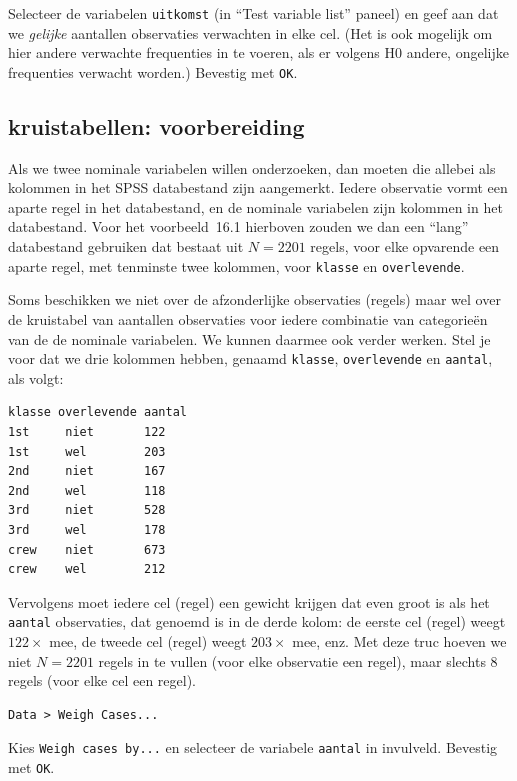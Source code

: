 \documentclass[
]{book}
\begin{document}
Selecteer de variabelen \texttt{uitkomst} (in ``Test variable list'' paneel) en
geef aan dat we \emph{gelijke} aantallen observaties verwachten in elke cel.
(Het is ook mogelijk om hier andere verwachte frequenties in te voeren,
als er volgens H0 andere, ongelijke frequenties verwacht worden.)
Bevestig met \texttt{OK}.

\hypertarget{kruistabellen-voorbereiding}{%
\subsection{kruistabellen: voorbereiding}\label{kruistabellen-voorbereiding}}

Als we twee nominale variabelen willen onderzoeken, dan moeten die
allebei als kolommen in het SPSS databestand zijn aangemerkt. Iedere
observatie vormt een aparte regel in het databestand, en de nominale
variabelen zijn kolommen in het databestand. Voor het
voorbeeld~16.1 hierboven zouden we dan een ``lang'' databestand
gebruiken dat bestaat uit \(N=2201\) regels, voor elke opvarende een
aparte regel, met tenminste twee kolommen, voor \texttt{klasse} en
\texttt{overlevende}.

Soms beschikken we niet over de afzonderlijke observaties (regels) maar
wel over de kruistabel van aantallen observaties voor iedere combinatie
van categorieën van de de nominale variabelen. We kunnen daarmee ook
verder werken. Stel je voor dat we drie kolommen hebben, genaamd
\texttt{klasse}, \texttt{overlevende} en \texttt{aantal}, als volgt:

\begin{verbatim}
klasse overlevende aantal
1st     niet       122
1st     wel        203
2nd     niet       167
2nd     wel        118
3rd     niet       528
3rd     wel        178
crew    niet       673
crew    wel        212
\end{verbatim}

Vervolgens moet iedere cel (regel) een gewicht krijgen dat even groot is
als het \texttt{aantal} observaties, dat genoemd is in de derde kolom: de
eerste cel (regel) weegt \(122\times\) mee, de tweede cel (regel) weegt
\(203\times\) mee, enz. Met deze truc hoeven we niet \(N=2201\) regels in te
vullen (voor elke observatie een regel), maar slechts 8 regels (voor
elke cel een regel).

\begin{verbatim}
Data > Weigh Cases... 
\end{verbatim}

Kies \texttt{Weigh\ cases\ by...} en selecteer de variabele \texttt{aantal} in
invulveld. Bevestig met \texttt{OK}.
\end{document}

